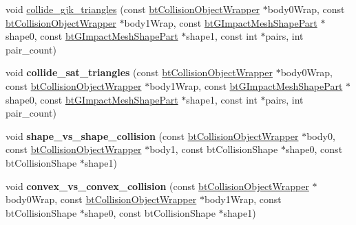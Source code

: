 \begin{DoxyCompactItemize}
\item 
void \hyperlink{classbtGImpactCollisionAlgorithm_a1cc907bcb394f7a95d609b1b56a5490e}{collide\+\_\+gjk\+\_\+triangles} (const \hyperlink{structbtCollisionObjectWrapper}{bt\+Collision\+Object\+Wrapper} $\ast$body0\+Wrap, const \hyperlink{structbtCollisionObjectWrapper}{bt\+Collision\+Object\+Wrapper} $\ast$body1\+Wrap, const \hyperlink{classbtGImpactMeshShapePart}{bt\+G\+Impact\+Mesh\+Shape\+Part} $\ast$shape0, const \hyperlink{classbtGImpactMeshShapePart}{bt\+G\+Impact\+Mesh\+Shape\+Part} $\ast$shape1, const int $\ast$pairs, int pair\+\_\+count)
\item 
\mbox{\label{classbtGImpactCollisionAlgorithm_aa3e30a3764a7cdb764940b7ae1e86279}} 
void {\bfseries collide\+\_\+sat\+\_\+triangles} (const \hyperlink{structbtCollisionObjectWrapper}{bt\+Collision\+Object\+Wrapper} $\ast$body0\+Wrap, const \hyperlink{structbtCollisionObjectWrapper}{bt\+Collision\+Object\+Wrapper} $\ast$body1\+Wrap, const \hyperlink{classbtGImpactMeshShapePart}{bt\+G\+Impact\+Mesh\+Shape\+Part} $\ast$shape0, const \hyperlink{classbtGImpactMeshShapePart}{bt\+G\+Impact\+Mesh\+Shape\+Part} $\ast$shape1, const int $\ast$pairs, int pair\+\_\+count)
\item 
\mbox{\label{classbtGImpactCollisionAlgorithm_ae7bcd385a621607be2ef6c1ee975ba9f}} 
void {\bfseries shape\+\_\+vs\+\_\+shape\+\_\+collision} (const \hyperlink{structbtCollisionObjectWrapper}{bt\+Collision\+Object\+Wrapper} $\ast$body0, const \hyperlink{structbtCollisionObjectWrapper}{bt\+Collision\+Object\+Wrapper} $\ast$body1, const bt\+Collision\+Shape $\ast$shape0, const bt\+Collision\+Shape $\ast$shape1)
\item 
\mbox{\label{classbtGImpactCollisionAlgorithm_a812b45921b8f0745454b5ed692e24dd0}} 
void {\bfseries convex\+\_\+vs\+\_\+convex\+\_\+collision} (const \hyperlink{structbtCollisionObjectWrapper}{bt\+Collision\+Object\+Wrapper} $\ast$body0\+Wrap, const \hyperlink{structbtCollisionObjectWrapper}{bt\+Collision\+Object\+Wrapper} $\ast$body1\+Wrap, const bt\+Collision\+Shape $\ast$shape0, const bt\+Collision\+Shape $\ast$shape1)
\item 
\mbox{\label{classbtGImpactCollisionAlgorithm_a341abca97b2386b7ce67b5940ee086e5}} 

\end{DoxyCompactItemize}
